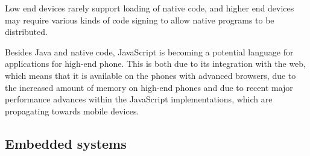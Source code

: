 \documentclass[11pt]{report}
\begin{document}
Low end devices rarely support loading of native code, and higher end devices may require various kinds of code signing to allow native programs to be distributed.

Besides Java and native code, JavaScript is becoming a potential language for applications for high-end phone. 
This is both due to its integration with the web, which means that it is available on the phones with advanced browsers, due to the increased amount of memory on high-end phones
and due to recent major performance advances within the JavaScript implementations, which are propagating towards mobile devices.

\subsection{Embedded systems}
\end{document}
